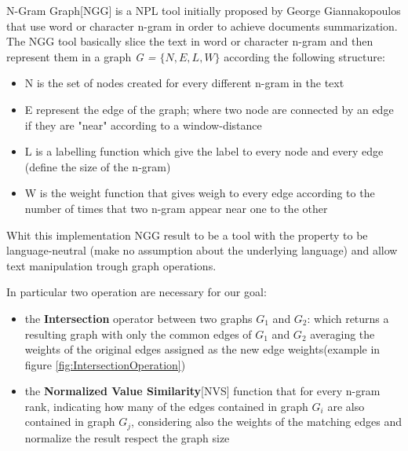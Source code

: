 N-Gram Graph[NGG] is a NPL tool initially proposed by George Giannakopoulos \cite{Ngram} that use word or character n-gram in order to achieve documents summarization. The NGG tool basically slice the text in word or character n-gram and then represent them in a graph \emph{G = $\lbrace N,E,L,W\rbrace$} according the following structure:
\begin{itemize}
	\item N is the set of nodes created for every different n-gram in the text
	\item E represent the edge of the graph; where two node are connected by an edge if they are "near" according to a window-distance
	\item L is a labelling function which give the label to every node and every edge (define the size of the n-gram)
	\item W is the weight function that gives weigh to every edge according to the number of times that two n-gram appear near one to the other
\end{itemize}

Whit this implementation NGG  result to be a tool with the property to be language-neutral (make no assumption about the underlying language) and allow text manipulation trough graph operations.

In particular two operation are necessary for our goal:
\begin{itemize}
\item the \textbf{Intersection} operator between two graphs $G_1$ and $G_2$: which returns a resulting graph with only the common edges of $G_1$ and $G_2$ averaging the weights of the original edges assigned as the new edge weights(example in figure \ref{fig:IntersectionOperation})
\item the \textbf{Normalized Value Similarity}[NVS] function that for every n-gram rank, indicating how many of the edges contained in graph $G_i$ are also contained in graph $G_j$, considering also the weights of the matching edges and normalize the result respect the graph size
\end{itemize}
 
